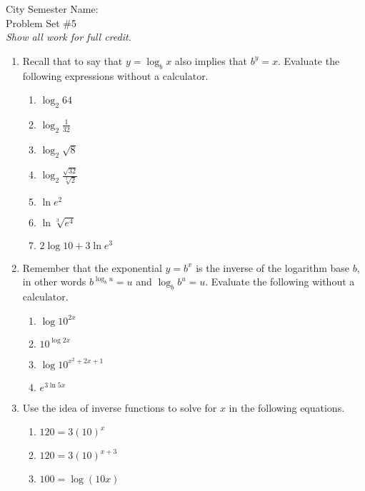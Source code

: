 \documentclass[12pt]{article}
\theoremstyle{plain}     %
\begin{document}
\large
City Semester  \hspace{8cm} Name:\makebox[6cm]{\hrulefill}
\\
Problem Set \#5\\
\normalsize 
\emph{Show all work for full credit.}\\
\begin{enumerate}
	\item Recall that to say that $y=\log_b x$ also implies that $b^y=x$. Evaluate the following expressions without a calculator.
	\begin{multicols}{2}
		\begin{enumerate}
			\item $\log_2 64$
			\item $\log_2 \frac{1}{32}$
			\item $\log_2 \sqrt{8}$
			\item $\log_2 \frac{\sqrt{32}}{\sqrt[3]{2}}$
			\item $\ln e^2$
			\item $\ln \sqrt[3]{e^4}$
			\item $2\log 10 + 3\ln e^3$
		\end{enumerate}
	\end{multicols}
	\item Remember that the exponential $y=b^x$ is the inverse of the logarithm base $b$, in other words $\displaystyle b^{\log_b u}=u$ and $\log_b b^u=u$. Evaluate the following without a calculator.
	\begin{multicols}{2}		
		\begin{enumerate}
			\item $\log 10^{2x}$
			\item $10^{\log 2x}$
			\item $\log 10^{x^2+2x+1}$
			\item $e^{3\ln 5x}$
		\end{enumerate}	
	\end{multicols}	
	\item Use the idea of inverse functions to solve for $x$ in the following equations.
	\begin{multicols}{2}
		\begin{enumerate}
			\item $120 = 3(10)^x$
			\item $120 = 3(10)^{x+3}$
			\item $100 = \log (10x)$

\end{enumerate}
\end{multicols}
\end{enumerate}
\end{document}

